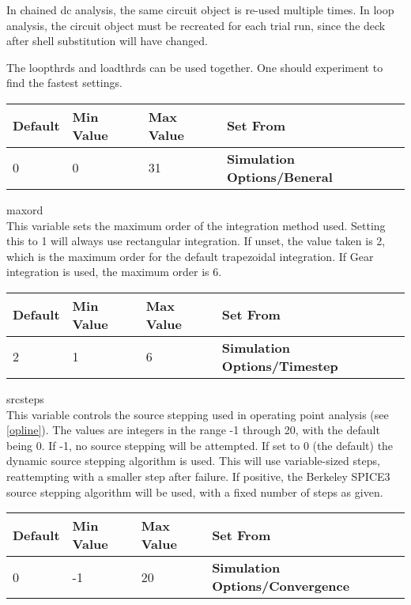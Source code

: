 \begin{description}
In chained dc analysis, the same circuit object is re-used multiple
times.  In loop analysis, the circuit object must be recreated for
each trial run, since the deck after shell substitution will have
changed.

The {\et loopthrds} and {\et loadthrds} can be used together.  One
should experiment to find the fastest settings.

\begin{tabular}{|l|l|l|l|}\hline
\bf Default & \bf Min Value & \bf Max Value & \bf Set From\\ \hline
0 & 0 & 31 & \bf Simulation Options/Beneral\\ \hline
\end{tabular}

\item{\et maxord}\\
This variable sets the maximum order of the integration method
used.  Setting this to 1 will always use rectangular integration.
If unset, the value taken is 2, which is the maximum order for the default
trapezoidal integration.  If Gear integration is used, the maximum
order is 6.

\begin{tabular}{|l|l|l|l|}\hline
\bf Default & \bf Min Value & \bf Max Value & \bf Set From\\ \hline
2 & 1 & 6 & \bf Simulation Options/Timestep\\ \hline
\end{tabular}

\item{\et srcsteps}\\
This variable controls the source stepping used in operating point
analysis (see \ref{opline}).  The values are integers in the range -1
through 20, with the default being 0.  If -1, no source stepping will
be attempted.  If set to 0 (the default) the dynamic source stepping
algorithm is used.  This will use variable-sized steps, reattempting
with a smaller step after failure.  If positive, the Berkeley SPICE3
source stepping algorithm will be used, with a fixed number of steps
as given.

\begin{tabular}{|l|l|l|l|}\hline
\bf Default & \bf Min Value & \bf Max Value & \bf Set From\\ \hline
0 & -1 & 20 & \bf Simulation Options/Convergence\\ \hline
\end{tabular}


\end{description}
